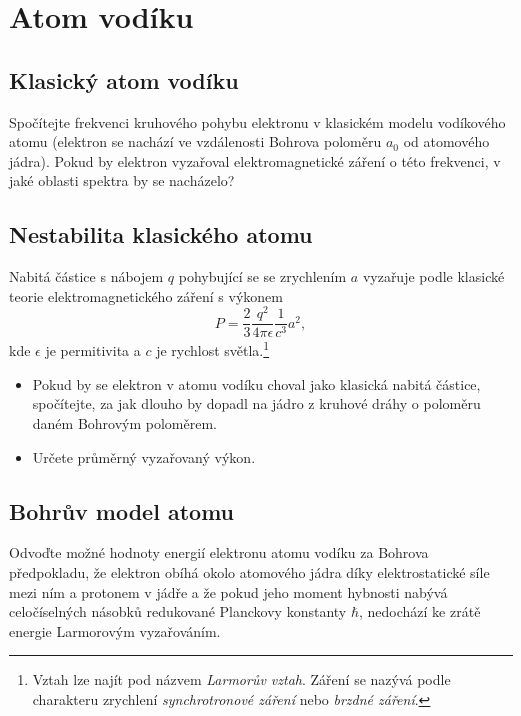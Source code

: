\section{Atom vodíku}
\subsection{Klasický atom vodíku}
    Spočítejte frekvenci kruhového pohybu elektronu v klasickém modelu vodíkového atomu (elektron se nachází ve vzdálenosti Bohrova poloměru $a_{0}$ od atomového jádra).
    Pokud by elektron vyzařoval elektromagnetické záření o této frekvenci, v jaké oblasti spektra by se nacházelo?


\subsection{Nestabilita klasického atomu}
    Nabitá částice s nábojem $q$ pohybující se se zrychlením $a$ vyzařuje podle klasické teorie elektromagnetického záření s výkonem
    \begin{equation}
        P=\frac{2}{3}\frac{q^2}{4\pi\epsilon}\frac{1}{c^3}a^{2},
    \end{equation}
    kde $\epsilon$ je permitivita a $c$ je rychlost světla.\footnote{Vztah lze najít pod názvem \emph{Larmorův vztah}. Záření se nazývá podle charakteru zrychlení \emph{synchrotronové záření} nebo \emph{brzdné záření}.}

    \begin{itemize}
        \item
            Pokud by se elektron v atomu vodíku choval jako klasická nabitá částice, spočítejte, za jak dlouho by dopadl na jádro z kruhové dráhy o poloměru daném Bohrovým poloměrem.
        \item
            Určete průměrný vyzařovaný výkon.
    \end{itemize}

\subsection{Bohrův model atomu}
    Odvoďte možné hodnoty energií elektronu atomu vodíku za Bohrova předpokladu, že elektron obíhá okolo atomového jádra díky elektrostatické síle mezi ním a protonem v jádře a že pokud jeho moment hybnosti nabývá celočíselných násobků redukované Planckovy konstanty $\hbar$, nedochází ke zrátě energie Larmorovým vyzařováním.


